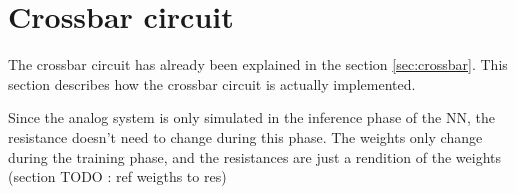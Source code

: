 \section{Crossbar circuit}
\label{sec:xbarCircuit}

The crossbar circuit has already been explained in the section \ref{sec:crossbar}. This section describes how the crossbar circuit is actually implemented.

Since the analog system is only simulated in the inference phase of the \ac{NN}, the resistance doesn't need to change during this phase. The weights only change during the training phase, and the resistances are just a rendition of the weights (section TODO : ref weigths to res)
